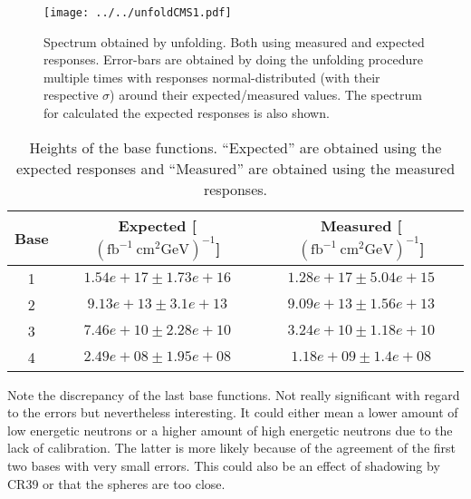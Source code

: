 \documentclass[12pt]{article}
\begin{document}
\begin{figure}
\texttt{[image: ../../unfoldCMS1.pdf]}
\caption{\label{milk1} Spectrum obtained by unfolding. Both using measured and expected responses. Error-bars are obtained by doing the unfolding procedure multiple times with responses normal-distributed (with their respective $\sigma$) around their expected/measured values. The spectrum for calculated the expected responses is also shown.}
\end{figure}
\begin{table}
\centering
\begin{tabular}{ccc}
\hline
\hline
Base&Expected [$(\mathrm{fb}^{-1}\ \mathrm{cm}^{2}\mathrm{GeV})^{-1}$]&Measured [$(\mathrm{fb}^{-1}\ \mathrm{cm}^{2}\mathrm{GeV})^{-1}$]\\
\hline
1 & $1.54e+17\pm1.73e+16$ &$ 1.28e+17\pm 5.04e+15$ \\
2 & $9.13e+13\pm3.1e+13$ &$ 9.09e+13\pm 1.56e+13$ \\
3 & $7.46e+10\pm2.28e+10$ &$ 3.24e+10\pm 1.18e+10$ \\
4 & $2.49e+08\pm1.95e+08$ &$ 1.18e+09\pm 1.4e+08$ \\
\hline
\hline
\end{tabular}
\caption{\label{blood} Heights of the base functions. ``Expected'' are obtained using the expected responses and ``Measured'' are obtained using the measured responses.}
\end{table}
Note the discrepancy of the last base functions. Not really significant with regard to the errors but nevertheless interesting. It could either mean a lower amount of low energetic neutrons or a higher amount of high energetic neutrons due to the lack of calibration. The latter is more likely because of the agreement of the first two bases with very small errors. This could also be an effect of shadowing by CR39 or that the spheres are too close.
\end{document}
